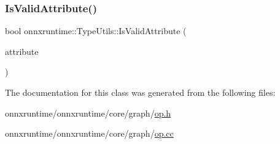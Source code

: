 \mbox{\label{classonnxruntime_1_1TypeUtils_a0e9e122537934c76e1f9f8799a4909e4}} 
\subsubsection{\texorpdfstring{Is\+Valid\+Attribute()}{IsValidAttribute()}}
{\footnotesize\ttfamily bool onnxruntime\+::\+Type\+Utils\+::\+Is\+Valid\+Attribute (\begin{DoxyParamCaption}\item[{const O\+N\+N\+X\+\_\+\+N\+A\+M\+E\+S\+P\+A\+C\+E\+::\+Attribute\+Proto \&}]{attribute }\end{DoxyParamCaption})\hspace{0.3cm}{\ttfamily [static]}}



The documentation for this class was generated from the following files\+:\begin{DoxyCompactItemize}
\item 
onnxruntime/onnxruntime/core/graph/\mbox{\hyperlink{op_8h}{op.\+h}}\item 
onnxruntime/onnxruntime/core/graph/\mbox{\hyperlink{op_8cc}{op.\+cc}}\end{DoxyCompactItemize}
